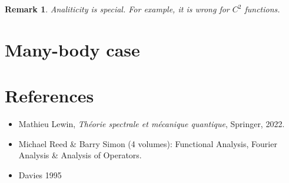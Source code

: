 \documentclass{article}
\newtheorem*{remark}{Remark}
\newcommand{\RR}{\mathbb{R}}
\newcommand{\cL}{\mathcal{L}}
\begin{document}
\begin{remark}
  Analiticity is special. 
  For example, it is wrong for $C^2$ functions.
\end{remark}

%    
%
% 
%



\section{Many-body case}

\section*{References}

\begin{itemize}
  \item Mathieu Lewin, \textit{Th\'eorie spectrale et mécanique quantique}, Springer, 2022.
  \item Michael Reed \& Barry Simon (4 volumes): Functional Analysis, Fourier Analysis \& Analysis of Operators.
  \item Davies 1995 
\end{itemize}
\end{document}
